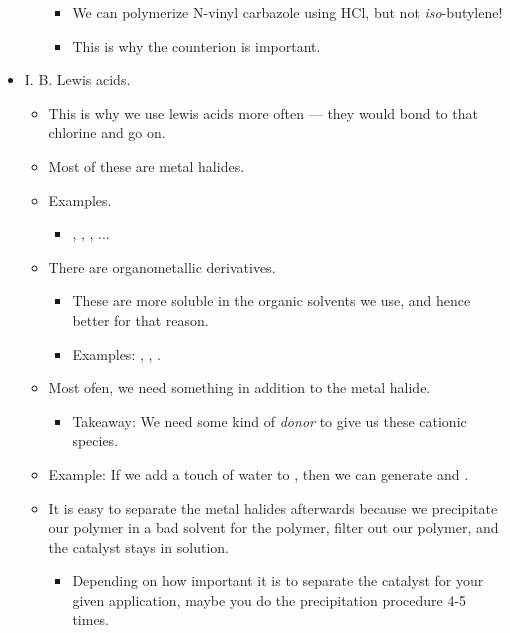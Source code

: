\documentclass[../notes.tex]{subfiles}
\begin{document}
\begin{itemize}
\begin{itemize}
\begin{itemize}
            \item We can polymerize N-vinyl carbazole using HCl, but not \emph{iso}-butylene!
            \item This is why the counterion is important.
        \end{itemize}
    \end{itemize}
    \item I. B. Lewis acids.
    \begin{itemize}
        \item This is why we use lewis acids more often --- they would bond to that chlorine and go on.
        \item Most of these are metal halides.
        \item Examples.
        \begin{itemize}
            \item {}, , , ...
        \end{itemize}
        \item There are organometallic derivatives.
        \begin{itemize}
            \item These are more soluble in the organic solvents we use, and hence better for that reason.
            \item Examples: , , .
        \end{itemize}
        \item Most ofen, we need something in addition to the metal halide.
        \begin{itemize}
            \item Takeaway: We need some kind of \emph{donor} to give us these cationic species.
        \end{itemize}
        \item Example: If we add a touch of water to , then we can generate  and .
        \item It is easy to separate the metal halides afterwards because we precipitate our polymer in a bad solvent for the polymer, filter out our polymer, and the catalyst stays in solution.
        \begin{itemize}
            \item Depending on how important it is to separate the catalyst for your given application, maybe you do the precipitation procedure 4-5 times.
        \end{itemize}
    \end{itemize}

\end{itemize}
\end{document}
